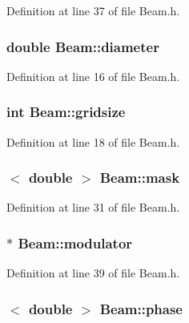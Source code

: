 Definition at line 37 of file Beam.h.

\hypertarget{classBeam_a5b8823412936aee5a88bc657e0ed546c}{
\subsubsection[{diameter}]{\setlength{\rightskip}{0pt plus 5cm}double {\bf Beam::diameter}}}
\label{classBeam_a5b8823412936aee5a88bc657e0ed546c}


Definition at line 16 of file Beam.h.

\hypertarget{classBeam_a1c813015bb33a0565e1ee3ea0d570e11}{
\subsubsection[{gridsize}]{\setlength{\rightskip}{0pt plus 5cm}int {\bf Beam::gridsize}}}
\label{classBeam_a1c813015bb33a0565e1ee3ea0d570e11}


Definition at line 18 of file Beam.h.

\hypertarget{classBeam_af1dc67711c28c260a813088d4afb14e9}{
\subsubsection[{mask}]{$<$ double $>$ {\bf Beam::mask}}}
\label{classBeam_af1dc67711c28c260a813088d4afb14e9}


Definition at line 31 of file Beam.h.

\hypertarget{classBeam_a1ef612af4b85d2e5866d40eec618efcb}{
\subsubsection[{modulator}]{$\ast$ {\bf Beam::modulator}}}
\label{classBeam_a1ef612af4b85d2e5866d40eec618efcb}


Definition at line 39 of file Beam.h.

\hypertarget{classBeam_aa2ed8956a6aca9da62da12bcb8cebb7b}{
\subsubsection[{phase}]{$<$ double $>$ {\bf Beam::phase}}}
\label{classBeam_aa2ed8956a6aca9da62da12bcb8cebb7b}


